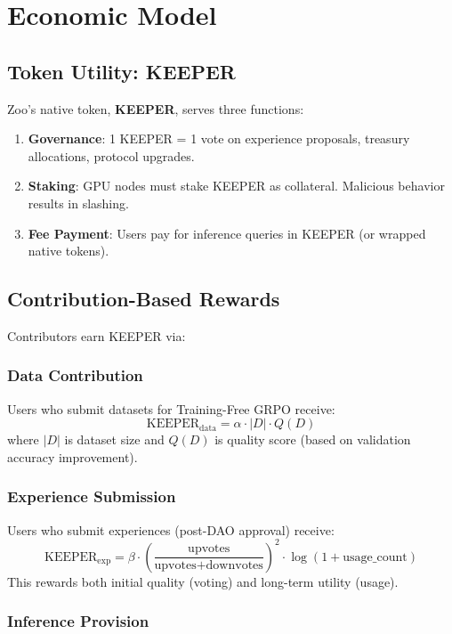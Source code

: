 \documentclass[11pt,a4paper]{article}
\begin{document}
\section{Economic Model}

\subsection{Token Utility: KEEPER}

Zoo's native token, \textbf{KEEPER}, serves three functions:

\begin{enumerate}
\item \textbf{Governance}: 1 KEEPER = 1 vote on experience proposals, treasury allocations, protocol upgrades.
\item \textbf{Staking}: GPU nodes must stake KEEPER as collateral. Malicious behavior results in slashing.
\item \textbf{Fee Payment}: Users pay for inference queries in KEEPER (or wrapped native tokens).
\end{enumerate}

\subsection{Contribution-Based Rewards}

Contributors earn KEEPER via:

\subsubsection{Data Contribution}

Users who submit datasets for Training-Free GRPO receive:
\[
\text{KEEPER}_{\text{data}} = \alpha \cdot |D| \cdot Q(D)
\]
where $|D|$ is dataset size and $Q(D)$ is quality score (based on validation accuracy improvement).

\subsubsection{Experience Submission}

Users who submit experiences (post-DAO approval) receive:
\[
\text{KEEPER}_{\text{exp}} = \beta \cdot \left(\frac{\text{upvotes}}{\text{upvotes} + \text{downvotes}}\right)^2 \cdot \log(1 + \text{usage\_count})
\]
This rewards both initial quality (voting) and long-term utility (usage).

\subsubsection{Inference Provision}
\end{document}
